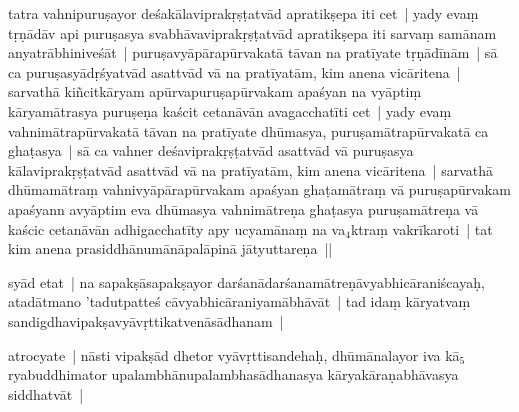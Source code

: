 \documentclass[article,12pt,a4paper]{memoir}%
\newcounter{parCount}
\begin{document}
	  \pstart \leavevmode%
	\label{thakur75-37.1}tatra vahnipuruṣayor deśakālaviprakṛṣṭatvād apratikṣepa iti cet | yady evaṃ tṛṇādāv api puruṣasya svabhāvaviprakṛṣṭatvād apratikṣepa iti sarvaṃ samānam anyatrābhiniveśāt | puruṣavyāpārapūrvakatā tāvan na pratīyate tṛṇādīnām | sā ca puruṣasyādṛśyatvād asattvād vā na pratīyatām, kim anena vicāritena | sarvathā kiñcitkāryam apūrvapuruṣapūrvakam apaśyan na vyāptiṃ kāryamātrasya puruṣeṇa kaścit cetanāvān avagacchatīti cet | yady evaṃ vahnimātrapūrvakatā tāvan na pratīyate dhūmasya, puruṣamātrapūrvakatā ca ghaṭasya | sā ca vahner deśaviprakṛṣṭatvād asattvād vā puruṣasya kālaviprakṛṣṭatvād asattvād vā na pratīyatām, kim anena vicāritena | sarvathā dhūmamātraṃ vahnivyāpārapūrvakam apaśyan ghaṭamātraṃ vā puruṣapūrvakam apaśyann avyāptim eva dhūmasya vahnimātreṇa ghaṭasya puruṣamātreṇa vā kaścic cetanāvān adhigacchatīty apy ucyamānaṃ na va{\tiny $_{4}$}ktraṃ vakrīkaroti | tat kim anena prasiddhānumānāpalāpinā jātyuttareṇa ||
	{}
	\pend%
      

	  \pstart \leavevmode%
	\label{thakur75-37.12}\label{rnā__96541}syād etat | na sapakṣāsapakṣayor darśanādarśanamātreṇāvyabhicāraniścayaḥ, atadātmano 'tadutpatteś cāvyabhicāraniyamābhāvāt | tad idaṃ kāryatvaṃ sandigdhavipakṣavyāvṛttikatvenāsādhanam |
	{}
	\pend%
      

	  \pstart \leavevmode%
	\label{thakur75-37.14}atrocyate | nāsti vipakṣād dhetor vyāvṛttisandehaḥ, dhūmānalayor iva kā{\tiny $_{5}$}ryabuddhimator upalambhānupalambhasādhanasya \label{ratnakīrtinibandhāvali__36r1PF7IMWMOO857NALIQLRG7O8}kāryakāraṇabhāvasya siddha\label{ratnakīrtinibandhāvali__36r1PF7IMWM0G3TH23WNU1X5LKO}tvāt |
	{}
	\pend%
      
\end{document}
